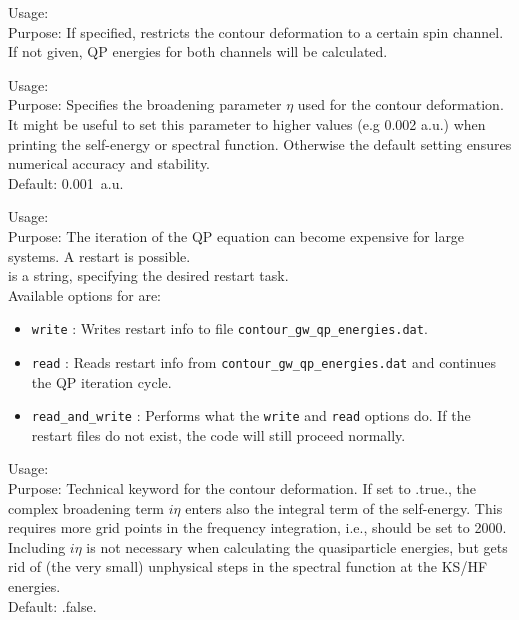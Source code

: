{ \noindent
  Usage:    \\[1.0ex]
  Purpose: If specified, restricts the contour deformation to a certain
  spin channel. If not given, QP energies for both channels will be calculated.
}

{ \noindent
  Usage:    \\[1.0ex]
  Purpose: Specifies the broadening parameter $\eta$ used for the 
  contour deformation. It might be useful to set this parameter to 
  higher values (e.g 0.002 a.u.) when printing the self-energy or 
  spectral function. Otherwise the default setting
  ensures numerical accuracy and stability. \\
  Default: 0.001~a.u.
}

{ \noindent
  Usage:    \\[1.0ex]
  Purpose: The iteration of the QP equation can become expensive
  for large systems. A restart is possible.\\[1.0ex]
   is a string, specifying the desired restart task. \\[1.0ex]
  Available options for  are:
  }
   \begin{itemize}
  \item \texttt{write} : Writes restart info to file \texttt{contour\_gw\_qp\_energies.dat}.
  \item \texttt{read} : Reads restart info from \texttt{contour\_gw\_qp\_energies.dat} and 
   continues the QP iteration cycle.
  \item \texttt{read\_and\_write} : Performs what the \texttt{write} and
    \texttt{read} options do. If the restart files do not exist, the
    code will still proceed normally.
\end{itemize}


{ \noindent
  Usage:    \\[1.0ex]
  Purpose: Technical keyword for the contour deformation. If set to .true., 
  the complex broadening term $i\eta$ enters also the integral term of the self-energy.
  This requires more grid points in the frequency integration, i.e.,
   should be set to 2000. Including $i\eta$
  is not necessary when calculating the quasiparticle energies, but gets rid of
  (the very small) unphysical steps in the spectral function at the
  KS/HF energies.
   \\
  Default: .false.
}

